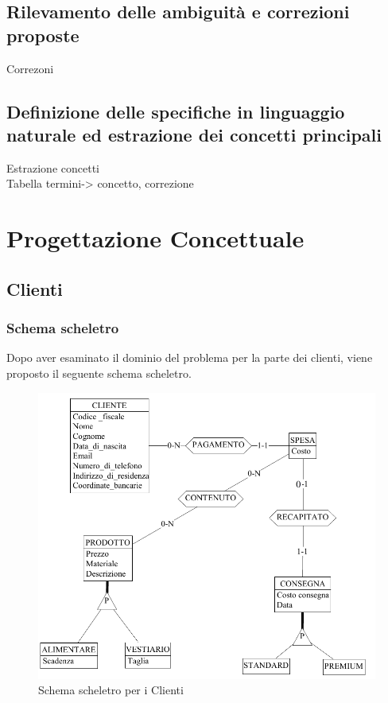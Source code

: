 \documentclass[a4paper,12pt]{report}
\begin{document}
\section{Rilevamento delle ambiguità e correzioni proposte}
Correzoni
\section{Definizione delle specifiche in linguaggio naturale ed estrazione dei concetti principali}
Estrazione concetti\\
Tabella termini-> concetto, correzione

\chapter{Progettazione Concettuale}
\section{Clienti}
\subsection{Schema scheletro}
Dopo aver esaminato il dominio del problema per la parte dei clienti, viene proposto il seguente schema scheletro.
\begin{figure}[H]
	\centering{}
	\includegraphics[width=\textwidth]{img/SchemaConcettuale-Clienti1.pdf}
	\caption{Schema scheletro per i Clienti}
\end{figure}
\end{document}
